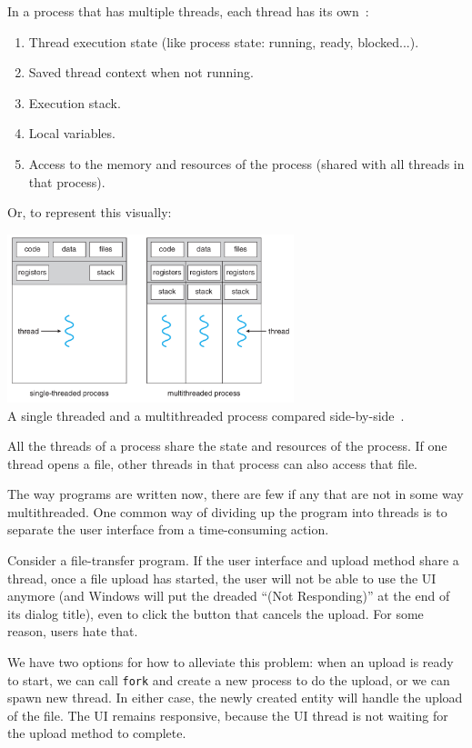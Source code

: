 In a process that has multiple threads, each thread has its own~\cite{osi}:
\begin{enumerate}
	\item Thread execution state (like process state: running, ready, blocked...).
	\item Saved thread context when not running.
	\item Execution stack.
	\item Local variables.
	\item Access to the memory and resources of the process (shared with all threads in that process).
\end{enumerate}

Or, to represent this visually:

\begin{center}
	\includegraphics[width=0.625\textwidth]{images/mthread2.png}\\
	A single threaded and a multithreaded process compared side-by-side~\cite{osc}.
\end{center}

All the threads of a process share the state and resources of the process. If one thread opens a file, other threads in that process can also access that file.

The way programs are written now, there are few if any that are not in some way multithreaded. One common way of dividing up the program into threads is to separate the user interface from a time-consuming action. 

Consider a file-transfer program. If the user interface and upload method share a thread, once a file upload has started, the user will not be able to use the UI anymore (and Windows will put the dreaded ``(Not Responding)'' at the end of its dialog title), even to click the button that cancels the upload. For some reason, users hate that. 

We have two options for how to alleviate this problem: when an upload is ready to start, we can call \texttt{fork} and create a new process to do the upload, or we can spawn  new thread. In either case, the newly created entity will handle the upload of the file. The UI remains responsive, because the UI thread is not waiting for the upload method to complete.

